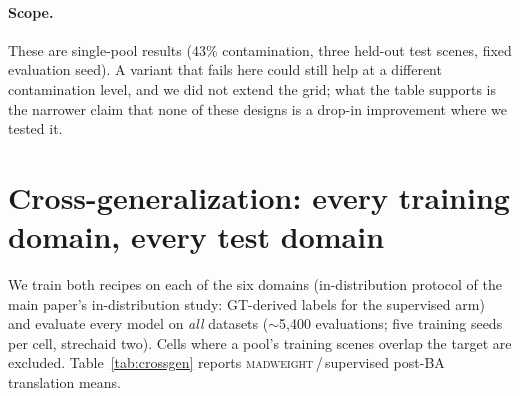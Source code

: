 \documentclass[10pt,twocolumn,letterpaper]{article}
\newcommand{\mad}{\textsc{madweight}}
\begin{document}
\paragraph{Scope.} These are single-pool results ($43\%$ contamination, three held-out
test scenes, fixed evaluation seed). A variant that fails here could still help at a
different contamination level, and we did not extend the grid; what the table supports
is the narrower claim that none of these designs is a drop-in improvement where we
tested it.

\section{Cross-generalization: every training domain, every test domain}\label{app:crossgen}
We train both recipes on each of the six domains (in-distribution protocol of
the main paper's in-distribution study: GT-derived labels for the supervised arm) and evaluate every model
on \emph{all} datasets ($\sim$5{,}400 evaluations; five training seeds per cell,
strechaid two). Cells where a pool's training scenes overlap the target are excluded.
Table~\ref{tab:crossgen} reports \mad{}\,/\,supervised post-BA translation means.

\begin{table}[t]\centering\footnotesize
\caption{\textbf{Cross-generalization grid}: rows = training domain, columns = test
dataset; each cell \mad{}\,/\,supervised (mean$\pm$std over training seeds). Diagonal
(*) = held-out in-distribution test (Table~4 of the main paper); ``leak'' = training
scenes overlap the target.}
\label{tab:crossgen}
\setlength{\tabcolsep}{2.5pt}%
\end{table}
\end{document}
